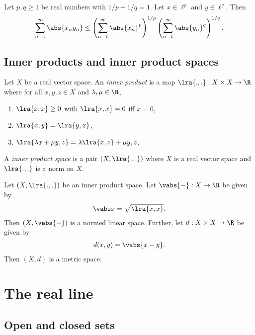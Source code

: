 \documentclass{article}
\begin{document}
\begin{lemma}
	Let $p,q\geq 1$ be real numbers with $1/p+1/q=1$. Let $x\in \ell^p$ and $y\in \ell^q$. Then
	\begin{align*}
		\sum_{n=1}^\infty \abs{x_ny_n}\leq
		\left(\sum_{n=1}^\infty\abs{x_n}^p\right)^{1/p}
		\left(\sum_{n=1}^\infty\abs{y_n}^q\right)^{1/q}.
	\end{align*}
\end{lemma}

\subsection{Inner products and inner product spaces}

\begin{definition}
	Let $X$ be a real vector space. An \emph{inner product}
	is a map $\lra{.,.}:X\times X\to\R$ where for all $x,y,z\in X$ and
	$\lambda,\mu\in\R$,
	\begin{enumerate}
		\item $\lra{x,x}\geq 0$ with $\lra{x,x}=0$ iff $x=0$,
		\item $\lra{x,y}=\lra{y,x}$,
		\item $\lra{\lambda x+\mu y,z}=\lambda\lra{x,z}+\mu{y,z}$.
	\end{enumerate}
	A \emph{inner product space} is a pair $(X, \lra{.,.})$ where $X$ is a real
	vector space and $\lra{.,.}$ is a norm on $X$.
\end{definition}

\begin{lemma}
	Let $(X,\lra{.,.})$ be an inner product space. Let $\vabs{-}:X\to\R$ be given
	by
	\begin{align*}
		\vabs x = \sqrt{\lra{x,x}}.
	\end{align*}
	Then $(X,\vabs{-})$ is a normed linear space. Further, let $d:X\times X\to\R$
	be given by
	\begin{align*}
		d(x,y)=\vabs{x-y}.
	\end{align*}
	Then $(X,d)$ is a metric space.
\end{lemma}

\section{The real line}

\subsection{Open and closed sets}
\end{document}
